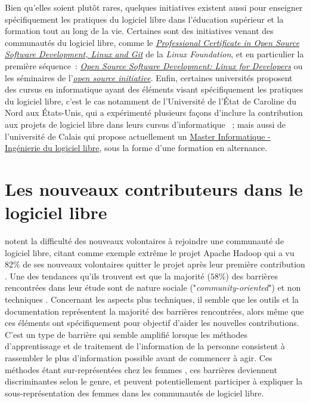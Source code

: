 \documentclass[dvipsnames,runningheads]{llncs}
\newcommand{\en}[1]{\foreignlanguage{english}{\emph{#1}}}
\begin{document}
    Bien qu'elles soient plutôt rares, quelques initiatives existent aussi pour enseigner spécifiquement les
    pratiques du logiciel libre dans l'éducation supérieur et la formation tout au long de la vie. Certaines
    sont des initiatives venant des communautés du logiciel libre, comme le
    \href{https://www.edx.org/professional-certificate/linuxfoundationx-open-source-software-development-linux-and-git}{\en{Professional
    Certificate in Open Source Software Development, Linux and Git}} de la \en{Linux Foundation}, et en
    particulier la première séquence :
    \href{https://www.edx.org/course/open-source-software-development-linux-for-developers}{\en{Open Source
    Software Development: Linux for Developers}} ou les séminaires de
    l'\href{https://opensource.org/osi-open-source-education}{\en{open source initiative}}. Enfin, certaines
    universités proposent des cursus en informatique ayant des éléments visant spécifiquement les pratiques du
    logiciel libre, c'est le cas notamment de l'Université de l'État de Caroline du Nord aux États-Unis, qui a
    expérimenté plusieurs façons d'inclure la contribution aux projets de logiciel libre dans leurs cursus
    d'informatique \cite{oss-edu-2008, oss-edu-2007} ; mais aussi de l'université de Calais qui propose
    actuellement un
    \href{https://www.univ-littoral.fr/formation/offre-de-formation/masters/master-informatique-ingenierie-du-logiciel-libre/}{Master
    Informatique - Ingénierie du logiciel libre}, sous la forme d'une formation en alternance.

    \section{Les nouveaux contributeurs dans le logiciel libre}

    \textcite{barriers-2018} notent la difficulté des nouveaux volontaires à rejoindre une communauté de
    logiciel libre, citant comme exemple extrême le projet Apache Hadoop qui a vu 82\% de ses nouveaux
    volontaires quitter le projet après leur première contribution \parencite{hadoop-dropout-2013}. Une des
    tendances qu'ils trouvent est que la majorité ($58\%$) des barrières rencontrées dans leur étude sont de
    nature sociale ("\en{community-oriented}") et non techniques \parencite[p.~1008]{barriers-2018}.
    Concernant les aspects plus techniques, il semble que les outils et la documentation représentent la
    majorité des barrières rencontrées, alors même que ces éléments ont spécifiquement pour objectif d'aider
    les nouvelles contributions. C'est un type de barrière qui semble amplifié lorsque les méthodes
    d'apprentissage et de traitement de l'information de la personne consistent à rassembler le plus
    d'information possible avant de commencer à agir. Ces méthodes étant sur-représentées chez les femmes
    \parencite{gender-information-processing-1995,gender-information-processing-2015}, ces barrières
    deviennent discriminantes selon le genre, et peuvent potentiellement participer à expliquer la
    sous-représentation des femmes dans les communautés de logiciel libre.
\end{document}

